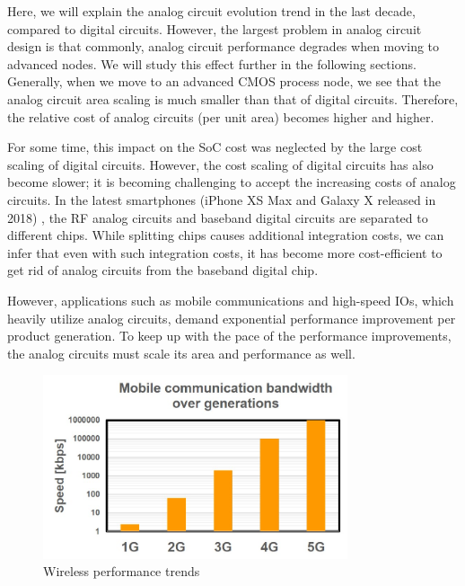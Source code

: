 Here, we will explain the analog circuit evolution trend in the last decade, compared to digital circuits.
However, the largest problem in analog circuit design is that commonly, analog circuit performance degrades when moving to advanced nodes.
We will study this effect further in the following sections.
Generally, when we move to an advanced CMOS process node, we see that the analog circuit area scaling is much smaller than that of digital circuits.
Therefore, the relative cost of analog circuits (per unit area) becomes higher and higher.

For some time, this impact on the SoC cost was neglected by the large cost scaling of digital circuits. 
However, the cost scaling of digital circuits has also become slower; it is becoming challenging to accept the increasing costs of analog circuits.
In the latest smartphones (iPhone XS Max and Galaxy X released in 2018) \cite{iphoneXS} \cite{galaxy}, the RF analog circuits and baseband digital circuits are separated to different chips.
While splitting chips causes additional integration costs, we can infer that even with such integration costs, it has become more cost-efficient to get rid of analog circuits from the baseband digital chip.


However, applications such as mobile communications and high-speed IOs, which heavily utilize analog circuits, demand exponential performance improvement per product generation. To keep up with the pace of the performance improvements, the analog circuits must scale its area and performance as well.

\begin{figure}[!]
\centering
  \includegraphics[width=0.8\textwidth]{figure/chap1/wireless-trends.jpg}
  \caption{Wireless performance trends}
  \label{wireless-trends}
\end{figure}

